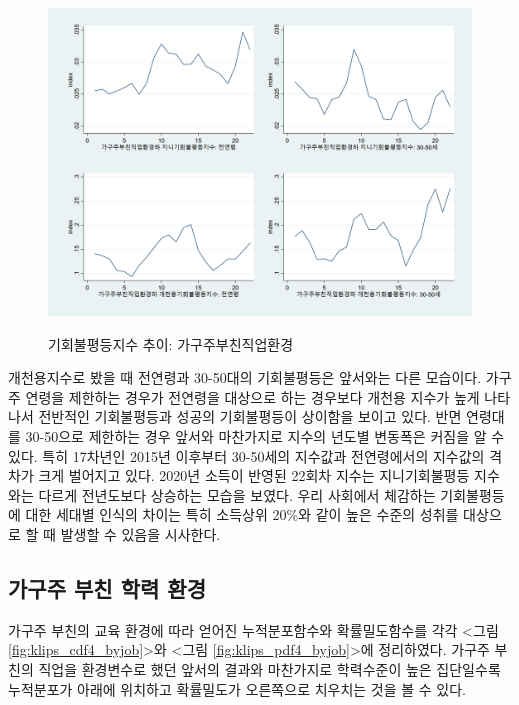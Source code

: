 \begin{figure}
    \centering
    \caption{기회불평등지수 추이: 가구주부친직업환경}
    \includegraphics[width=\textwidth]{figure/incn1m_jobgrp_index.png}
    \label{fig:klips_jobgrp}
\end{figure}

개천용지수로 봤을 때 전연령과 30-50대의 기회불평등은 앞서와는 다른 모습이다.
가구주 연령을 제한하는 경우가 전연령을 대상으로 하는 경우보다 개천용 지수가 높게 나타나서 전반적인 기회불평등과 성공의 기회불평등이 상이함을 보이고 있다.
반면 연령대를 30-50으로 제한하는 경우 앞서와 마찬가지로 지수의 년도별 변동폭은 커짐을 알 수 있다.
특히 17차년인 2015년 이후부터 30-50세의 지수값과 전연령에서의 지수값의 격차가 크게 벌어지고 있다.
2020년 소득이 반영된 22회차 지수는 지니기회불평등 지수와는 다르게 전년도보다 상승하는 모습을 보였다.
우리 사회에서 체감하는 기회불평등에 대한 세대별 인식의 차이는 특히 소득상위 20\%와 같이 높은 수준의 성취를 대상으로 할 때 발생할 수 있음을 시사한다.

\subsection{가구주 부친 학력 환경}

가구주 부친의 교육 환경에 따라 얻어진 누적분포함수와 확률밀도함수를 각각 <그림 \ref{fig:klips_cdf4_byjob}>와 <그림 \ref{fig:klips_pdf4_byjob}>에 정리하였다.
가구주 부친의 직업을 환경변수로 했던 앞서의 결과와 마찬가지로 학력수준이 높은 집단일수록 누적분포가 아래에 위치하고 확률밀도가 오른쪽으로 치우치는 것을 볼 수 있다.

